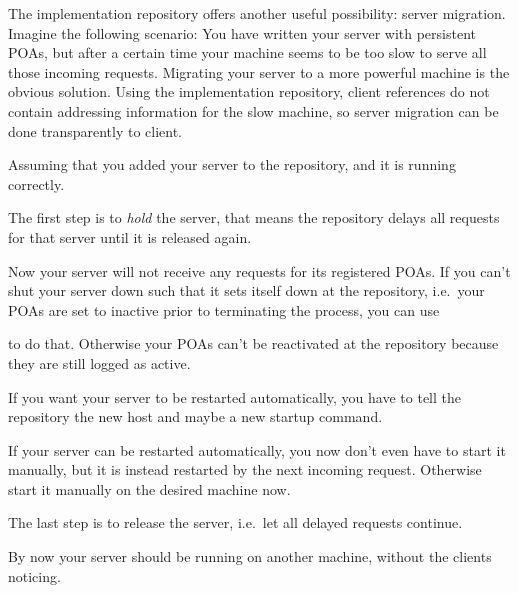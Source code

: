\documentclass[12pt]{scrbook}
\begin{document}
The  implementation  repository  offers  another  useful  possibility:
server migration.   Imagine the  following scenario: You  have written
your  server with  persistent  POAs,  but after  a  certain time  your
machine  seems   to  be   too  slow  to   serve  all   those  incoming
requests.  Migrating your  server to  a more  powerful machine  is the
obvious  solution.    Using  the  implementation   repository,  client
references do not contain addressing information for the slow machine,
so server migration can be done transparently to client.

Assuming  that you  added your  server to  the repository,  and  it is
running  correctly.  


The first step is to {\em  hold} the server, that means the repository
delays all requests for that server until it is released again.


Now  your server  will not  receive  any requests  for its  registered
POAs. If you can't shut your server down such that it sets itself down
at  the repository,  i.e.~your POAs  are  set to  inactive prior  to
terminating the process, you can use


to  do  that.   Otherwise  your  POAs  can't  be  reactivated  at  the
repository because they are still logged as active.

If you  want your  server to be  restarted automatically, you  have to
tell the repository the new host and maybe a new startup command.


If your server can be restarted automatically, you now don't even have
to start it manually, but it is instead restarted by the next incoming
request.  Otherwise start it manually on the desired machine now.

The last step is to release  the server, i.e.~let all delayed requests
continue.


By now your  server should be running on  another machine, without the
clients noticing.
\end{document}
